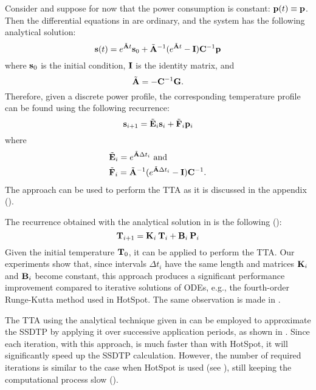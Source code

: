 Consider  and suppose for now that the power
consumption is constant: $\mathbf{p}(t) \equiv \mathbf{p}$. Then the differential equations in
 are ordinary, and the system has the following
analytical solution:
\begin{equation} \elab{solution}
  \vs(t) = e^{\tm{A} t} \vs_0 + \tm{A}^{-1} (e^{\tm{A} t} - \m{I}) \m{C}^{-1} \vp
\end{equation}
where $\mathbf{s}_0$ is the initial condition, $\mathbf{I}$ is the identity matrix, and
\[
  \tilde{\mathbf{A}} = -\mathbf{C}^{-1} \mathbf{G}.
\]
Therefore, given a discrete power profile, the corresponding temperature profile
can be found using the following recurrence:
\begin{equation} \elab{recurrent-system}
  \vs_{i + 1} = \tm{E}_i \vs_i + \tm{F}_i \vp_i
\end{equation}
where
\begin{align*}
  & \tilde{\mathbf{E}}_i = e^{\tilde{\mathbf{A}} \Delta t_i} \text{ and} \\
  & \tilde{\mathbf{F}}_i = \tilde{\mathbf{A}}^{-1}(e^{\tilde{\mathbf{A}} \Delta t_i} - \mathbf{I})\mathbf{C}^{-1}.
\end{align*}
The approach can be used to perform the TTA as it is discussed in the appendix
().

The recurrence obtained with the analytical solution in  is the
following ():
\[
  \mathbf{T}_{i+1} = \mathbf{K}_i \: \mathbf{T}_i + \mathbf{B}_i \: \mathbf{P}_i
\]
Given the initial temperature $\mathbf{T}_0$, it can be applied to perform the TTA.
Our experiments show that, since intervals $\Delta t_i$ have the same length and
matrices $\mathbf{K}_i$ and $\mathbf{B}_i$ become constant, this approach produces a
significant performance improvement compared to iterative solutions of ODEs,
e.g., the fourth-order Runge-Kutta method used in HotSpot. The same observation
is made in \cite{thiele2011}.

The TTA using the analytical technique given in  can be
employed to approximate the SSDTP by applying it over successive application
periods, as shown in . Since each iteration,
with this approach, is much faster than with HotSpot, it will significantly
speed up the SSDTP calculation. However, the number of required iterations is
similar to the case when HotSpot is used (see ), still
keeping the computational process slow ().

